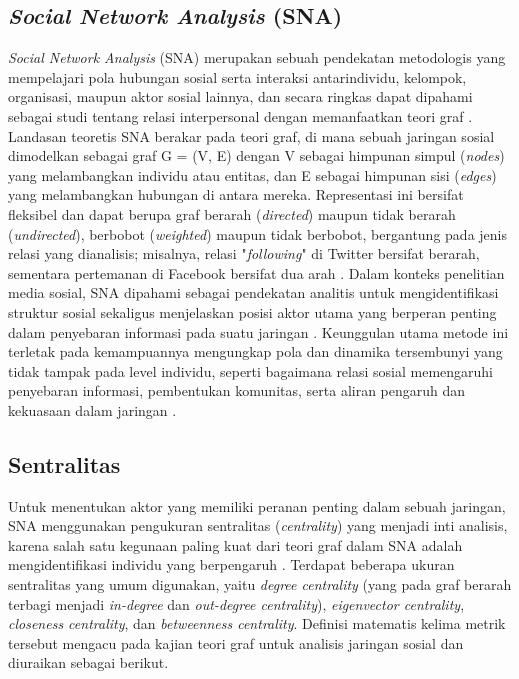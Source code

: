 \subsection{\textit{Social Network Analysis} (SNA)}
\textit{Social Network Analysis} (SNA) merupakan sebuah pendekatan metodologis yang mempelajari pola hubungan sosial serta interaksi antarindividu, kelompok, organisasi, maupun aktor sosial lainnya, dan secara ringkas dapat dipahami sebagai studi tentang relasi interpersonal dengan memanfaatkan teori graf \cite{GoledzinowskiBlocki2023}. 
Landasan teoretis SNA berakar pada teori graf, di mana sebuah jaringan sosial dimodelkan sebagai graf G = (V, E) dengan V sebagai himpunan simpul (\textit{nodes}) yang melambangkan individu atau entitas, dan E sebagai himpunan sisi (\textit{edges}) yang melambangkan hubungan di antara mereka.
Representasi ini bersifat fleksibel dan dapat berupa graf berarah (\textit{directed}) maupun tidak berarah (\textit{undirected}), berbobot (\textit{weighted}) maupun tidak berbobot, bergantung pada jenis relasi yang dianalisis; misalnya, relasi "\textit{following}" di Twitter bersifat berarah, sementara pertemanan di Facebook bersifat dua arah \cite{Mamatha2024}. 
Dalam konteks penelitian media sosial, SNA dipahami sebagai pendekatan analitis untuk mengidentifikasi struktur sosial sekaligus menjelaskan posisi aktor utama yang berperan penting dalam penyebaran informasi pada suatu jaringan \cite{Sitorus2022}. 
Keunggulan utama metode ini terletak pada kemampuannya mengungkap pola dan dinamika tersembunyi yang tidak tampak pada level individu, seperti bagaimana relasi sosial memengaruhi penyebaran informasi, pembentukan komunitas, serta aliran pengaruh dan kekuasaan dalam jaringan \cite{GoledzinowskiBlocki2023}.

\subsection{Sentralitas}
\label{subsec:sentralitas}
Untuk menentukan aktor yang memiliki peranan penting dalam sebuah jaringan, SNA menggunakan pengukuran sentralitas (\textit{centrality}) yang menjadi inti analisis, karena salah satu kegunaan paling kuat dari teori graf dalam SNA adalah mengidentifikasi individu yang berpengaruh \cite{Mamatha2024}.
Terdapat beberapa ukuran sentralitas yang umum digunakan, yaitu \textit{degree centrality} (yang pada graf berarah terbagi menjadi \textit{in-degree} dan \textit{out-degree centrality}), \textit{eigenvector centrality}, \textit{closeness centrality}, dan \textit{betweenness centrality}. Definisi matematis kelima metrik tersebut mengacu pada kajian teori graf untuk analisis jaringan sosial \cite{Mamatha2024} dan diuraikan sebagai berikut.


